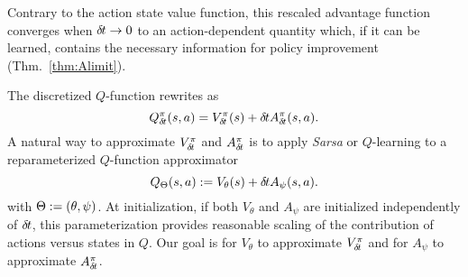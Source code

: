 Contrary to the action state value function,
this
rescaled advantage function converges when ${\delta\hspace{-.1em}t}\to 0$
to an action-dependent quantity which, if it can be learned, contains the
necessary information for policy improvement (Thm.~\ref{thm:Alimit}).




The discretized $Q$-function rewrites as
\begin{equation}
	Q^\pi_{\delta\hspace{-.1em}t}(s, a) = V^\pi_{\delta\hspace{-.1em}t}(s) + {\delta\hspace{-.1em}t} A^\pi_{\delta\hspace{-.1em}t}(s, a).
	\label{eq:reparam_q_pi}
\end{equation}
A natural way to approximate $V^\pi_{\delta\hspace{-.1em}t}$ and $A^\pi_{\delta\hspace{-.1em}t}$ is to apply
\emph{Sarsa} or $Q$-learning to a reparameterized $Q$-function approximator
\begin{equation}
	Q_\Theta(s, a) \mathrel{\mathop{:}}= V_{\theta}(s) + {\delta\hspace{-.1em}t} A_{\psi}(s, a).
\end{equation}
with $\Theta \mathrel{\mathop{:}}= (\theta, \psi)$. At initialization, if both $V_{\theta}$ and
$A_{\psi}$ are initialized independently of ${\delta\hspace{-.1em}t}$, this parameterization
provides reasonable scaling of the contribution of actions versus states
in $Q$.
Our goal is for $V_\theta$ to approximate $V^\pi_{\delta\hspace{-.1em}t}$ and for
$A_{\psi}$ to approximate $A^\pi_{\delta\hspace{-.1em}t}$.


